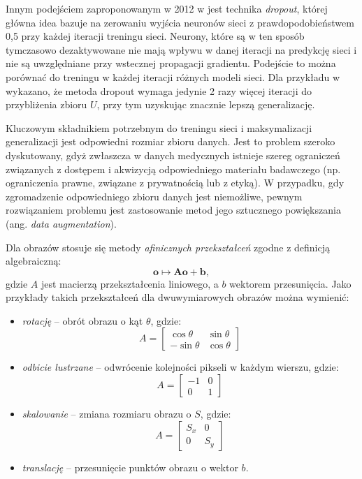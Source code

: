 Innym podejściem zaproponowanym w 2012 w \cite{DBLP:journals/corr/abs-1207-0580} jest technika \textit{dropout}, której główna idea bazuje na zerowaniu wyjścia neuronów sieci z prawdopodobieństwem 0,5 przy każdej iteracji treningu sieci. Neurony, które są w ten sposób tymczasowo dezaktywowane nie mają wpływu w danej iteracji na predykcję sieci i nie są uwzględniane przy wstecznej propagacji gradientu. Podejście to można porównać do treningu w każdej iteracji różnych modeli sieci. Dla przykładu w \cite{Krizhevsky2012} wykazano, że metoda dropout wymaga jedynie 2 razy więcej iteracji do przybliżenia zbioru $U$, przy tym uzyskując znacznie lepszą generalizację. 

Kluczowym składnikiem potrzebnym do treningu sieci i maksymalizacji generalizacji jest odpowiedni rozmiar zbioru danych. Jest to problem szeroko dyskutowany, gdyż zwłaszcza w danych medycznych istnieje szereg ograniczeń związanych z dostępem i akwizycją odpowiedniego materiału badawczego (np. ograniczenia prawne, związane z prywatnością lub z etyką). W przypadku, gdy zgromadzenie odpowiedniego zbioru danych jest niemożliwe, pewnym rozwiązaniem problemu jest zastosowanie metod jego sztucznego powiększania (ang. \textit{data augmentation}).

Dla obrazów stosuje się metody \textit{afinicznych przekształceń} zgodne z definicją algebraiczną:
\begin{equation}
	\mathbf o \mapsto \mathbf{Ao} + \mathbf b,
\end{equation}
gdzie $A$ jest macierzą przekształcenia liniowego, a $b$ wektorem przesunięcia. Jako przykłady takich przekształceń dla dwuwymiarowych obrazów można wymienić:
\begin{itemize}
	\item \textit{rotację} -- obrót obrazu o kąt $\theta$, gdzie:
	\begin{equation}
	A = \begin{bmatrix} 
	\cos \theta & \sin \theta\\
	-\sin \theta & \cos \theta
	\end{bmatrix}
	\end{equation}	
	\item \textit{odbicie lustrzane} -- odwrócenie kolejności pikseli w każdym wierszu, gdzie:
	\begin{equation}
		A = \begin{bmatrix} 
		-1 & 0\\
		0 & 1
	\end{bmatrix}
	\end{equation}
	\item \textit{skalowanie} -- zmiana rozmiaru obrazu o $S$, gdzie:
	\begin{equation}
			A = \begin{bmatrix} 
		S_x & 0\\
		0 & S_y
	\end{bmatrix}
	\end{equation}
	\item \textit{translację} -- przesunięcie punktów obrazu o wektor $b$.
\end{itemize}

